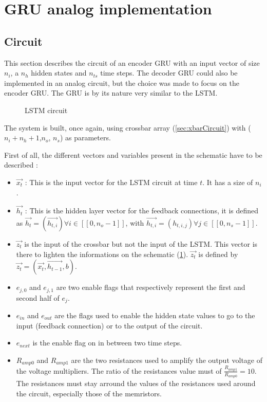 \section{\acs{GRU} analog implementation}\label{sec:gruCircuit}

\subsection{Circuit}

This section describes the circuit of an encoder \ac{GRU} with an input vector of size $n_i$, a $n_h$ hidden states and $n_{ts}$ time steps. The decoder \ac{GRU} could also be implemented in an analog circuit, but the choice was made to focus on the encoder \ac{GRU}. The \ac{GRU} is by its nature very similar to the \ac{LSTM}.

\begin{figure}[H]
  \centering
  
  \caption{\ac{LSTM} circuit}
  \label{circt:lstm}
\end{figure}

The system is built, once again, using crossbar array (\cref{sec:xbarCircuit}) with ($n_i+n_h+1$,$n_o$, $n_s$) as parameters.

First of all, the different vectors and variables present in the schematic have to be described :

\begin{itemize}
  \item $\overrightarrow{x_t}$ : This is the input vector for the \ac{LSTM} circuit at time $t$. It has a size of $n_i$.
  \item $\overrightarrow{h_t}$ : This is the hidden layer vector for the feedback connections, it is defined as $\overrightarrow{h_t}=(\overrightarrow{h_{t,i}}) \forall i\in [\![0,n_o-1]\!]$, with $\overrightarrow{h_{t,i}}=(h_{t,i,j}) \forall j\in [\![0,n_s-1]\!]$.
  \item $\overrightarrow{z_t}$ is the input of the crossbar but not the input of the \ac{LSTM}. This vector is there to lighten the informations on the schematic (\cref{circt:lstm}). $\overrightarrow{z_t}$ is defined by $\overrightarrow{z_t}=(\overrightarrow{x_t},\overrightarrow{h_{t-1}},b)$.
  \item $e_{j,0}$ and $e_{j,1}$ are two enable flags that respectively represent the first and second half of $e_j$.
  \item $e_{in}$ and $e_{out}$ are the flags used to enable the hidden state values to go to the input (feedback connection) or to the output of the circuit.
  \item $e_{next}$ is the enable flag on in between two time steps.
  \item $R_{amp0}$ and $R_{amp1}$ are the two resistances used to amplify the output voltage of the voltage multipliers. The ratio of the resistances value must of $\frac{R_{amp1}}{R_{amp0}}=10$. The resistances must stay arround the values of the resistances used around the circuit, especially those of the memristors.
\end{itemize}

